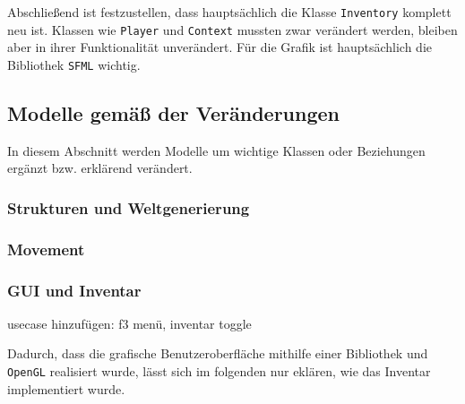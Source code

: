 \documentclass{article}
\begin{document}
Abschließend ist festzustellen, dass hauptsächlich die Klasse \texttt{Inventory} komplett neu ist. Klassen wie \texttt{Player} und \texttt{Context} mussten zwar verändert werden, bleiben aber in ihrer Funktionalität unverändert. Für die Grafik ist hauptsächlich die Bibliothek \texttt{SFML} wichtig.

\subsection{Modelle gemä\ss{} der Veränderungen}

In diesem Abschnitt werden Modelle um wichtige Klassen oder Beziehungen ergänzt bzw. erklärend verändert.

\subsubsection{Strukturen und Weltgenerierung}

\subsubsection{Movement}

\subsubsection{GUI und Inventar}

usecase hinzufügen: f3 menü, inventar toggle

Dadurch, dass die grafische Benutzeroberfläche mithilfe einer Bibliothek und \texttt{OpenGL} realisiert wurde, lässt sich im folgenden nur eklären, wie das Inventar implementiert wurde.
\end{document}
